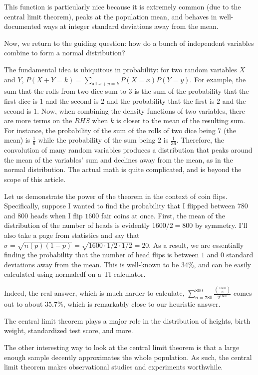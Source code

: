 \documentclass{article}
\begin{document}
This function is particularly nice because it is extremely common (due to the central limit theorem), peaks at the population mean, and behaves in well-documented ways at integer standard deviations away from the mean. 

Now, we return to the guiding question: how do a bunch of independent variables combine to form a normal distribution?

The fundamental idea is ubiquitous in probability: for two random variables $X$ and $Y$, $\displaystyle P(X+Y=k) = \sum_{\text{all } x+ y = k} P(X=x)P(Y=y)$. For example, the sum that the rolls from two dice sum to $3$ is the sum of the probability that the first dice is $1$ and the second is $2$ and the probability that the first is $2$ and the second is $1$. Now, when combining the density functions of two variables, there are more terms on the $RHS$ when $k$ is closer to the mean of the resulting sum. For instance, the probability of the sum of the rolls of two dice being $7$ (the mean) is $\frac{1}{6}$ while the probability of the sum being $2$ is $\frac{1}{36}$. Therefore, the convolution of many random variables produces a distribution that peaks around the mean of the variables' sum and declines away from the mean, as in the normal distribution. The actual math is quite complicated, and is beyond the scope of this article. 

Let us demonstrate the power of the theorem in the context of coin flips. Specifically, suppose I wanted to find the probability that I flipped between $780$ and $800$ heads when I flip $1600$ fair coins at once. First, the mean of the distribution of the number of heads is evidently $1600/2 = 800$ by symmetry. I'll also take a page from statistics and say that $\sigma = \sqrt{n(p)(1-p)} = \sqrt{1600 \cdot 1/2 \cdot 1/2} = 20$. As a result, we are essentially finding the probability that the number of head flips is between $1$ and $0$ standard deviations away from the mean. This is well-known to be $34 \%$, and can be easily calculated using normalcdf on a TI-calculator. 

Indeed, the real answer, which is much harder to calculate, $\displaystyle \sum_{n=780}^{800} \frac{\binom{1600}{n}}{2^{1600}}$ comes out to about $35.7 \%$, which is remarkably close to our heuristic answer.

The central limit theorem plays a major role in the distribution of heights, birth weight, standardized test score, and more.

The other interesting way to look at the central limit theorem is that a large enough sample decently approximates the whole population. As such, the central limit theorem makes observational studies and experiments worthwhile. 
\end{document}

